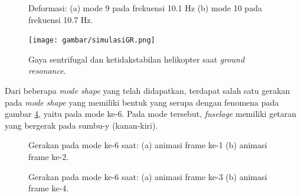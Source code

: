 \begin{figure}[H]
	\begin{subfigure}{0.49\textwidth}
		\centering
		\caption{}
		\label{fig:mode9}
	\end{subfigure}
	\centering
	\begin{subfigure}{0.49\textwidth}
		\centering
		\caption{}
		\label{fig:mode10}
	\end{subfigure}
	\caption{Deformasi: (a) mode 9 pada frekuensi 10.1 Hz (b) mode 10 pada frekuensi 10.7 Hz.}
\end{figure}

\begin{figure}[H]
	\centering
	\texttt{[image: gambar/simulasiGR.png]}
	\caption{Gaya sentrifugal dan ketidakstabilan helikopter saat \textit{ground resonance}.}
	\label{fig:simulasiGR}
\end{figure}

Dari beberapa \textit{mode shape} yang telah didapatkan, terdapat salah satu gerakan pada \textit{mode shape} yang memiliki bentuk yang serupa dengan fenomena pada gambar \ref{fig:simulasiGR}, yaitu pada mode ke-6. Pada mode tersebut, \textit{fuselage} memiliki getaran yang bergerak pada sumbu-y (kanan-kiri).

\begin{figure}[H]
	\begin{subfigure}{0.49\textwidth}
		\centering
		\caption{}
		\label{fig:mode6_frame_1}
	\end{subfigure}
	\centering
	\begin{subfigure}{0.49\textwidth}
		\centering
		\caption{}
		\label{fig:mode6_frame_2}
	\end{subfigure}
	\caption{Gerakan pada mode ke-6 saat: (a) animasi frame ke-1 (b) animasi frame ke-2.}
\end{figure}

\begin{figure}[H]
	\begin{subfigure}{0.49\textwidth}
		\centering
		\caption{}
		\label{fig:mode6_frame_3}
	\end{subfigure}
	\centering
	\begin{subfigure}{0.49\textwidth}
		\centering
		\caption{}
		\label{fig:mode6_frame_4}
	\end{subfigure}
	\caption{Gerakan pada mode ke-6 saat: (a) animasi frame ke-3 (b) animasi frame ke-4.}
\end{figure}

